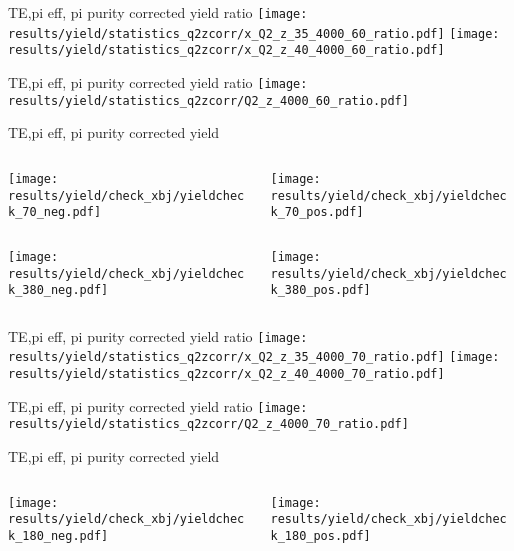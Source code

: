 \begin{frame}{TE,pi eff, pi purity corrected yield ratio}
\texttt{[image: results/yield/statistics\_q2zcorr/x\_Q2\_z\_35\_4000\_60\_ratio.pdf]}
\texttt{[image: results/yield/statistics\_q2zcorr/x\_Q2\_z\_40\_4000\_60\_ratio.pdf]}
\end{frame}
\begin{frame}{TE,pi eff, pi purity corrected yield ratio}
\texttt{[image: results/yield/statistics\_q2zcorr/Q2\_z\_4000\_60\_ratio.pdf]}
\end{frame}
\begin{frame}{TE,pi eff, pi purity corrected yield}
\begin{columns}
\begin{column}[T]{0.5\textwidth}
\texttt{[image: results/yield/check\_xbj/yieldcheck\_70\_neg.pdf]}
\end{column}
\begin{column}[T]{0.5\textwidth}
\texttt{[image: results/yield/check\_xbj/yieldcheck\_70\_pos.pdf]}
\end{column}
\end{columns}
\begin{columns}
\begin{column}[T]{0.5\textwidth}
\texttt{[image: results/yield/check\_xbj/yieldcheck\_380\_neg.pdf]}
\end{column}
\begin{column}[T]{0.5\textwidth}
\texttt{[image: results/yield/check\_xbj/yieldcheck\_380\_pos.pdf]}
\end{column}
\end{columns}
\end{frame}
\begin{frame}{TE,pi eff, pi purity corrected yield ratio}
\texttt{[image: results/yield/statistics\_q2zcorr/x\_Q2\_z\_35\_4000\_70\_ratio.pdf]}
\texttt{[image: results/yield/statistics\_q2zcorr/x\_Q2\_z\_40\_4000\_70\_ratio.pdf]}
\end{frame}
\begin{frame}{TE,pi eff, pi purity corrected yield ratio}
\texttt{[image: results/yield/statistics\_q2zcorr/Q2\_z\_4000\_70\_ratio.pdf]}
\end{frame}
\begin{frame}{TE,pi eff, pi purity corrected yield}
\begin{columns}
\begin{column}[T]{0.5\textwidth}
\texttt{[image: results/yield/check\_xbj/yieldcheck\_180\_neg.pdf]}
\end{column}
\begin{column}[T]{0.5\textwidth}
\texttt{[image: results/yield/check\_xbj/yieldcheck\_180\_pos.pdf]}
\end{column}
\end{columns}
\end{frame}
